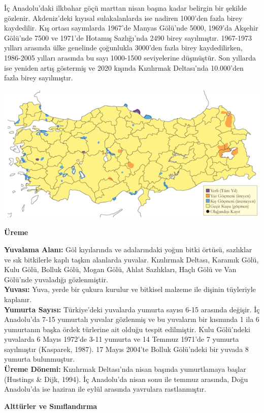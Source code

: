 \documentclass[
  a4paper,
  DIV=11,
  numbers=noendperiod]{scrreprt}
\begin{document}
İç Anadolu'daki ilkbahar göçü marttan nisan başına kadar belirgin bir
şekilde gözlenir. Akdeniz'deki kıyısal sulakalanlarda ise nadiren
1000'den fazla birey kaydedilir. Kış ortası sayımlarda 1967'de Manyas
Gölü'nde 5000, 1969'da Akşehir Gölü'nde 7500 ve 1971'de Hotamış
Sazlığı'nda 2490 birey sayılmıştır. 1967-1973 yılları arasında ülke
genelinde çoğunlukla 3000'den fazla birey kaydedilirken, 1986-2005
yılları arasında bu sayı 1000-1500 seviyelerine düşmüştür. Son yıllarda
ise yeniden artış göstermiş ve 2020 kışında Kızılırmak Deltası'nda
10.000'den fazla birey sayılmıştır.

\includegraphics{images/harita_Page_014.png}

\textbf{Üreme}

\textbf{Yuvalama Alanı:} Göl kıyılarında ve adalarındaki yoğun bitki
örtüsü, sazlıklar ve sık bitkilerle kaplı taşkın alanlarda yuvalar.
Kızılırmak Deltası, Karamık Gölü, Kulu Gölü, Bolluk Gölü, Mogan Gölü,
Ahlat Sazlıkları, Haçlı Gölü ve Van Gölü'nde yuvaladığı gözlenmiştir.\\
\textbf{Yuvası:} Yuva, yerde bir çukura kurulur ve bitkisel malzeme ile
dişinin tüyleriyle kaplanır.\\
\textbf{Yumurta Sayısı:} Türkiye'deki yuvalarda yumurta sayısı 6-15
arasında değişir. İç Anadolu'da 7-15 yumurtalı yuvalar gözlenmiş ve bu
yuvaların bir kısmında 1 ila 6 yumurtanın başka ördek türlerine ait
olduğu tespit edilmiştir. Kulu Gölü'ndeki yuvalarda 6 Mayıs 1972'de 3-11
yumurta ve 14 Temmuz 1971'de 7 yumurta sayılmıştır (Kasparek, 1987). 17
Mayıs 2004'te Bolluk Gölü'ndeki bir yuvada 8 yumurta bulunmuştur.\\
\textbf{Üreme Dönemi:} Kızılırmak Deltası'nda nisan başında yumurtlamaya
başlar (Hustings \& Dijk, 1994). İç Anadolu'da nisan sonu ile temmuz
arasında, Doğu Anadolu'da ise haziran ile eylül arasında yavrulara
rastlanmıştır.

\textbf{Alttürler ve Sınıflandırma}
\end{document}
